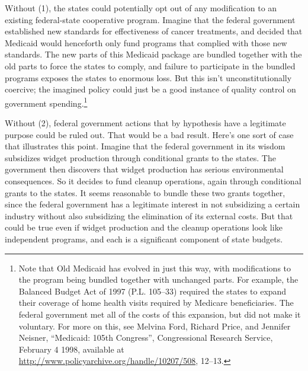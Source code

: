 \documentclass[
  11pt,
  letterpaper,
  DIV=11,
  numbers=noendperiod,
  twoside]{scrartcl}
\begin{document}
Without (1), the states could potentially opt out of any modification to
an existing federal-state cooperative program. Imagine that the federal
government established new standards for effectiveness of cancer
treatments, and decided that Medicaid would henceforth only fund
programs that complied with those new standards. The new parts of this
Medicaid package are bundled together with the old parts to force the
states to comply, and failure to participate in the bundled programs
exposes the states to enormous loss. But this isn't unconstitutionally
coercive; the imagined policy could just be a good instance of quality
control on government spending.\footnote{Note that Old Medicaid has
  evolved in just this way, with modifications to the program being
  bundled together with unchanged parts. For example, the Balanced
  Budget Act of 1997 (P.L. 105--33) required the states to expand their
  coverage of home health visits required by Medicare beneficiaries. The
  federal government met all of the costs of this expansion, but did not
  make it voluntary. For more on this, see Melvina Ford, Richard Price,
  and Jennifer Neisner, ``Medicaid: 105th Congress'', Congressional
  Research Service, February 4 1998, available at
  \url{http://www.policyarchive.org/handle/10207/508}, 12--13.}

Without (2), federal government actions that by hypothesis have a
legitimate purpose could be ruled out. That would be a bad result.
Here's one sort of case that illustrates this point. Imagine that the
federal government in its wisdom subsidizes widget production through
conditional grants to the states. The government then discovers that
widget production has serious environmental consequences. So it decides
to fund cleanup operations, again through conditional grants to the
states. It seems reasonable to bundle these two grants together, since
the federal government has a legitimate interest in not subsidizing a
certain industry without also subsidizing the elimination of its
external costs. But that could be true even if widget production and the
cleanup operations look like independent programs, and each is a
significant component of state budgets.
\end{document}

